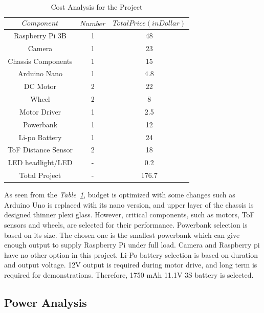 \documentclass[a4paper,12pt]{article}
\begin{document}
	\begin{table}[H]
  \centering
 	
 	\caption{Cost Analysis for the Project}
    \begin{tabular}{c|c|c}
       $$Component$$ & $$Number$$ & $$Total Price (in Dollar)$$  \\ \hline
       Raspberry Pi 3B & 1 & 48   \\ \hline
       Camera & 1 & 23   \\ \hline
       Chassis Components & 1 & 15   \\ \hline
       Arduino Nano & 1 &  4.8 \\ \hline
       DC Motor & 2 & 22 \\ \hline
       Wheel & 2 & 8 \\ \hline
       Motor Driver & 1 &  2.5 \\ \hline
       Powerbank & 1 & 12 \\ \hline
       Li-po Battery  & 1 & 24 \\ \hline
       ToF Distance Sensor & 2 & 18 \\ \hline
       LED headlight/LED & - & 0.2 \\ \hline
       Total Project & - & 176.7 
         
  
  \end{tabular} 
  \label{tab:cost}
    
\end{table}

	As seen from the \textit{Table~\ref{tab:cost}}, budget is optimized with some changes such as Arduino Uno is replaced with its nano version, and upper layer of the chassis is designed thinner plexi glass. However, critical components, such as motors, ToF sensors and wheels, are selected for their performance. Powerbank selection is based on its size. The chosen one is the smallest powerbank which can give enough output to supply Raspberry Pi under full load. Camera and Raspberry pi have no other option in this project. Li-Po battery selection is based on duration and output voltage. 12V output is required during motor drive, and long term is required for demonstrations. Therefore, 1750 mAh 11.1V 3S battery is selected. 
  
  \subsection{Power Analysis}
  
\end{document}
